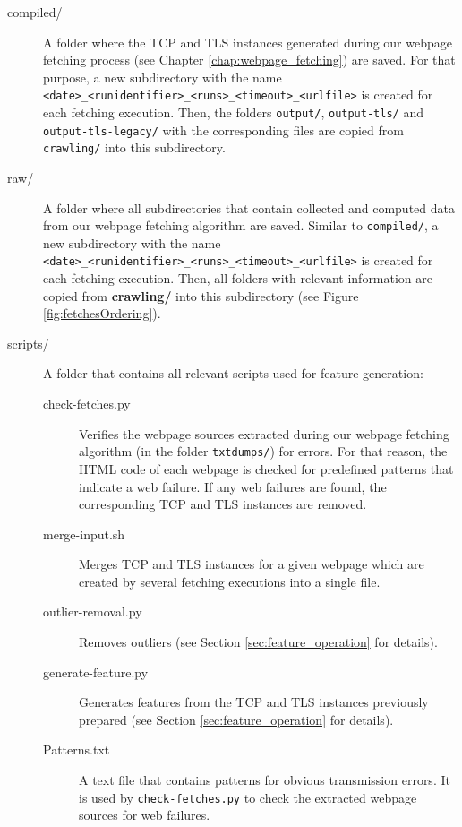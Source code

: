 \begin{description}
\item[compiled/] A folder where the \ac{TCP} and \ac{TLS} instances generated during our webpage fetching process (see Chapter \ref{chap:webpage_fetching}) are saved. For that purpose, a new subdirectory with the name \texttt{<date>\_<runidentifier>\_<runs>\_<timeout>\_<urlfile>} is created for each fetching execution. Then, the folders \texttt{output/}, \texttt{output-tls/} and \texttt{output-tls-legacy/} with the corresponding files are copied from \texttt{crawling/} into this subdirectory.
\item [raw/] A folder where all subdirectories that contain collected and computed data from our webpage fetching algorithm are saved. Similar to \texttt{compiled/}, a new subdirectory with the name \texttt{<date>\_<runidentifier>\_<runs>\_<timeout>\_<urlfile>} is created for each fetching execution. Then, all folders with relevant information are copied from \textbf{crawling/} into this subdirectory (see Figure \ref{fig:fetchesOrdering}).
\item[scripts/] A folder that contains all relevant scripts used for feature generation:
\begin{description}
\item[check-fetches.py] Verifies the webpage sources extracted during our webpage fetching algorithm (in the folder \texttt{txtdumps/}) for errors. For that reason, the \ac{HTML} code of each webpage is checked for predefined patterns that indicate a web failure. If any web failures are found, the corresponding \ac{TCP} and \ac{TLS} instances are removed.
\item[merge-input.sh] Merges \ac{TCP} and \ac{TLS} instances for a given webpage which are created by several fetching executions into a single file.
\item[outlier-removal.py] Removes outliers (see Section \ref{sec:feature_operation} for details).
\item[generate-feature.py] Generates features from the \ac{TCP} and \ac{TLS} instances previously prepared (see Section \ref{sec:feature_operation} for details).
\item[Patterns.txt] A text file that contains patterns for obvious transmission
errors. It is used by \texttt{check-fetches.py} to check the extracted webpage sources for web failures.

\end{description}
\end{description}
